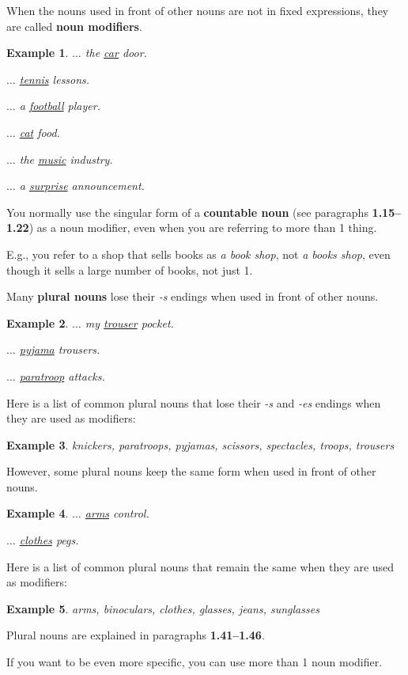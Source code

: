\documentclass[oneside]{book}
\numberwithin{equation}{section}
\newtheorem{example}{Example}[section]
\begin{document}
%
When the nouns used in front of other nouns are not in fixed expressions, they are called \textbf{noun modifiers}.
\begin{example}
    $\ldots$ the \underline{car} door.
    
    $\ldots$ \underline{tennis} lessons.
    
    $\ldots$ a \underline{football} player.
    
    $\ldots$ \underline{cat} food.
    
    $\ldots$ the \underline{music} industry.
    
    $\ldots$ a \underline{surprise} announcement.
\end{example}
%
\noindent{} You normally use the singular form of a \textbf{countable noun} (see paragraphs \textbf{1.15--1.22}) as a noun modifier, even when you are referring to more than 1 thing.

E.g., you refer to a shop that sells books as \textit{a book shop}, not \textit{a books shop}, even though it sells a large number of books, not just 1.

%
Many \textbf{plural nouns} lose their \textit{-s} endings when used in front of other nouns.
\begin{example}
    $\ldots$ my \underline{trouser} pocket.
    
    $\ldots$ \underline{pyjama} trousers.
    
    $\ldots$ \underline{paratroop} attacks.
\end{example}
Here is a list of common plural nouns that lose their \textit{-s} and \textit{-es} endings when they are used as modifiers:
\begin{example}
    knickers, paratroops, pyjamas, scissors, spectacles, troops, trousers
\end{example}
However, some plural nouns keep the same form when used in front of other nouns.
\begin{example}
    $\ldots$ \underline{arms} control.
    
    $\ldots$ \underline{clothes} pegs.
\end{example}
Here is a list of common plural nouns that remain the same when they are used as modifiers:
\begin{example}
    arms, binoculars, clothes, glasses, jeans, sunglasses
\end{example}
Plural nouns are explained in paragraphs \textbf{1.41--1.46}.

%
\noindent{} If you want to be even more specific, you can use more than 1 noun modifier.
\end{document}
